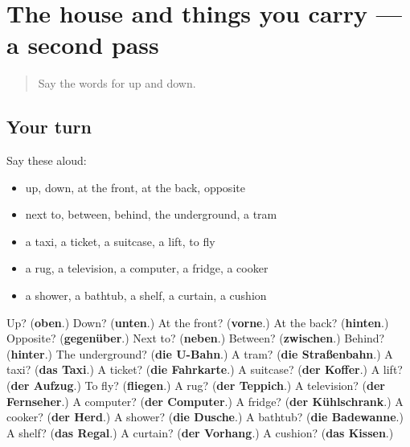 \section[(dialogue)]{The house and things you carry — a second pass}

\label{lesson:GE-R113-second-pass-the-house-and-things-you-carry}



\begin{quote}
Say the words for up and down.
\end{quote}

\subsection*{Your turn}
Say these aloud:

\begin{itemize}
\raggedright
  \item up, down, at the front, at the back, opposite
  \item next to, between, behind, the underground, a tram
  \item a taxi, a ticket, a suitcase, a lift, to fly
  \item a rug, a television, a computer, a fridge, a cooker
  \item a shower, a bathtub, a shelf, a curtain, a cushion
\end{itemize}

\begin{tcolorbox}[breakable,colback=teal!4,colframe=teal!35!black,title={Before you move on}]
Up? (\textbf{oben}.) Down? (\textbf{unten}.) At the front? (\textbf{vorne}.) At the back? (\textbf{hinten}.) Opposite? (\textbf{gegenüber}.) Next to? (\textbf{neben}.) Between? (\textbf{zwischen}.) Behind? (\textbf{hinter}.) The underground? (\textbf{die U-Bahn}.) A tram? (\textbf{die Straßenbahn}.) A taxi? (\textbf{das Taxi}.) A ticket? (\textbf{die Fahrkarte}.) A suitcase? (\textbf{der Koffer}.) A lift? (\textbf{der Aufzug}.) To fly? (\textbf{fliegen}.) A rug? (\textbf{der Teppich}.) A television? (\textbf{der Fernseher}.) A computer? (\textbf{der Computer}.) A fridge? (\textbf{der Kühlschrank}.) A cooker? (\textbf{der Herd}.) A shower? (\textbf{die Dusche}.) A bathtub? (\textbf{die Badewanne}.) A shelf? (\textbf{das Regal}.) A curtain? (\textbf{der Vorhang}.) A cushion? (\textbf{das Kissen}.)
\end{tcolorbox}
